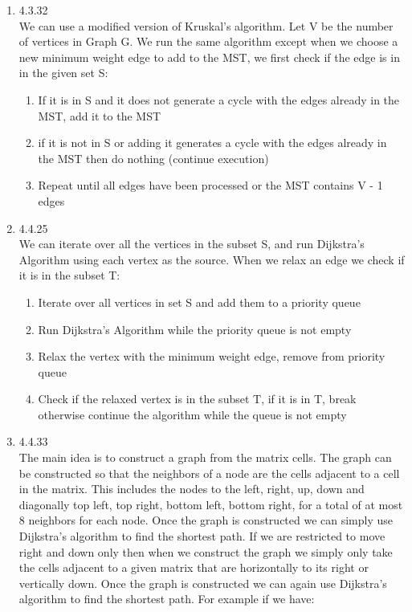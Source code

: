 \documentclass[11pt,fleqn]{article}
\begin{document}
\begin{enumerate}
\item 4.3.32\\
We can use a modified version of Kruskal's algorithm. Let V be the number of vertices in Graph G. We run the same algorithm except when we choose a new minimum weight edge to add to the MST, we first check if the edge is in in the given set S:\\
\begin{enumerate}
\item If it is in S and it does not generate a cycle with the edges already in the MST, add it to the MST 
\item if it is not in S or adding it generates a cycle with the edges already in the MST then do nothing (continue execution)
\item Repeat until all edges have been processed or the MST contains V - 1 edges

\end{enumerate}


\item 4.4.25\\
We can iterate over all the vertices in the subset S, and run Dijkstra's Algorithm using each vertex as the source. When we relax an edge we check if it is in the subset T:
\begin{enumerate}
\item Iterate over all vertices in set S and add them to a priority queue
\item Run Dijkstra's Algorithm while the priority queue is not empty
\item Relax the vertex with the minimum weight edge, remove from priority queue
\item Check if the relaxed vertex is in the subset T, if it is in T, break otherwise continue the algorithm while the queue is not empty
\end{enumerate}

\item 4.4.33\\
The main idea is to construct a graph from the matrix cells. The graph can be constructed so that the neighbors of a node are the cells adjacent to a cell in the matrix. This includes the nodes to the left, right, up, down and diagonally top left, top right, bottom left, bottom right, for a total of at most 8 neighbors for each node. Once the graph is constructed we can simply use Dijkstra's algorithm to find the shortest path. If we are restricted to move right and down only then when we construct the graph we simply only take the cells adjacent to a given matrix that are horizontally to its right or vertically down. Once the graph is constructed we can again use Dijkstra's algorithm to find the shortest path. For example if we have:\\ 


\end{enumerate}
\end{document}

